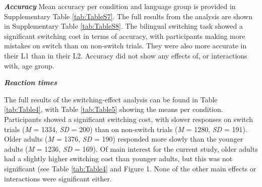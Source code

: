 \documentclass[
]{article}
\begin{document}
\textbf{\emph{Accuracy}}
Mean accuracy per condition and language group is provided in Supplementary Table \ref{tab:TableS7}. The full results from the analysis are shown in Supplementary Table \ref{tab:TableS8}. The bilingual switching task showed a significant switching cost in terms of accuracy, with participants making more mistakes on switch than on non-switch trials. They were also more accurate in their L1 than in their L2. Accuracy did not show any effects of, or interactions with, age group.

\textbf{\emph{Reaction times}}

The full results of the switching-effect analysis can be found in Table \ref{tab:Table4}, with Table \ref{tab:Table5} showing the means per condition. Participants showed a significant switching cost, with slower responses on switch trials (\emph{M} = 1334, \emph{SD} = 200) than on non-switch trials (\emph{M} = 1280, \emph{SD} = 191). Older adults (\emph{M} = 1376, \emph{SD} = 190) responded more slowly than the younger adults (\emph{M} = 1236, \emph{SD} = 169). Of main interest for the current study, older adults had a slightly higher switching cost than younger adults, but this was not significant (see Table \ref{tab:Table4} and Figure 1. None of the other main effects or interactions were significant either.
\end{document}
